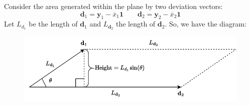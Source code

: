 \documentclass[a4paper]{article}
\newcommand{\highspace}{\vspace{1.2em}\noindent}
\begin{document}
    \highspace
    Consider the area generated within the plane by two deviation vectors:
    \begin{equation*}
        \mathbf{d}_{1} = \mathbf{y}_{1} - \overline{x}_{1} \mathbf{1}
        \hspace{2em}
        \mathbf{d}_{2} = \mathbf{y}_{2} - \overline{x}_{2} \mathbf{1}
    \end{equation*}
    Let $L_{d_{1}}$ be the length of $\mathbf{d}_{1}$ and $L_{\mathbf{d}_{2}}$ the length of $\mathbf{d}_{2}$. So, we have the diagram:
    \begin{figure}[!htp]
        \centering
        \includegraphics[width=\textwidth]{img/generalized-variance-1.pdf}
    \end{figure}
\end{document}
